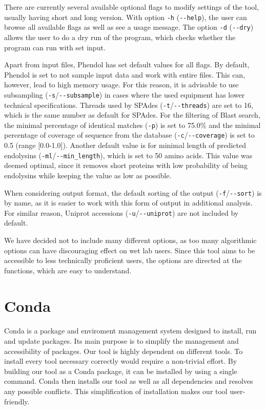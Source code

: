 There are currently several available optional flags to modify settings of the tool, usually having short and long version. With option \texttt{-h} (\texttt{-{}-help}), the user can browse all available flags as well as see a usage message. The option \texttt{-d} (\texttt{-{}-dry}) allows the user to do a dry run of the program, which checks whether the program can run with set input.

Apart from input files, Phendol has set default values for all flags. By default, Phendol is set to not sample input data and work with entire files. This can, however, lead to high memory usage. For this reason, it is advisable to use subsampling (\texttt{-s}/\texttt{-{}-subsample}) in cases where the used equipment has lower technical specifications. Threads used by SPAdes (\texttt{-t}/\texttt{-{}-threads}) are set to 16, which is the same number as default for SPAdes. For the filtering of Blast search, the minimal percentage of identical matches (\texttt{-p}) is set to 75.0\% and the minimal percentage of coverage of sequence from the database (\texttt{-c}/\texttt{-{}-coverage}) is set to 0.5 (range [0.0-1.0]). Another default value is for minimal length of predicted endolysins (\texttt{-ml}/\texttt{-{}-min\_length}), which is set to 50 amino acids. This value was deemed optimal, since it removes short proteins with low probability of being endolysins while keeping the value as low as possible. 

When considering output format, the default sorting of the output (\texttt{-f}/\texttt{-{}-sort}) is by name, as it is easier to work with this form of output in additional analysis. For similar reason, Uniprot accessions (\texttt{-u}/\texttt{-{}-uniprot}) are not included by default.

We have decided not to include many different options, as too many algorithmic options can have discouraging effect on wet lab users. Since this tool aims to be accessible to less technically proficient users, the options are directed at the functions, which are easy to understand.

\section{Conda}
\paragraph*{}
Conda\cite{yan2018hands} is a package and enviroment management system designed to install, run and update packages. Its main purpose is to simplify the management and accessibility of packages. Our tool is highly dependent on different tools. To install every tool necessary correctly would require a non-trivial effort. By building our tool as a Conda package, it can be installed by using a single command. Conda then installs our tool as well as all dependencies and resolves any possible conflicts. This simplification of installation makes our tool user-friendly.

